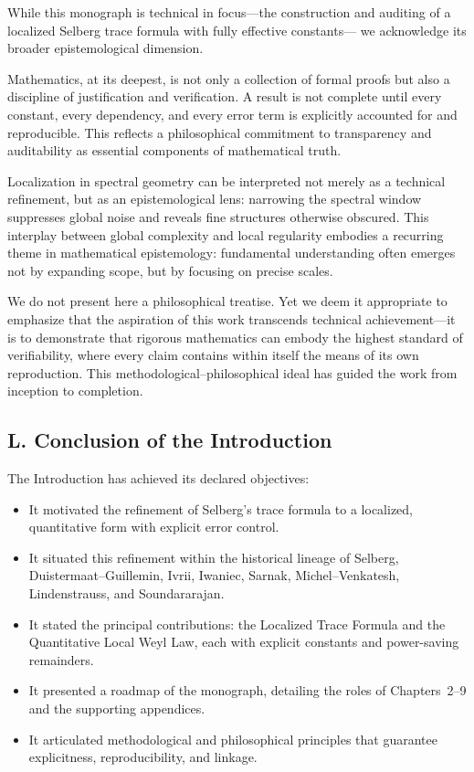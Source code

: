 While this monograph is technical in focus—the construction and auditing
of a localized Selberg trace formula with fully effective constants—
we acknowledge its broader epistemological dimension.

Mathematics, at its deepest, is not only a collection of formal proofs
but also a discipline of justification and verification.
A result is not complete until every constant, every dependency,
and every error term is explicitly accounted for and reproducible.
This reflects a philosophical commitment to transparency and auditability
as essential components of mathematical truth.

Localization in spectral geometry can be interpreted not merely as a technical refinement,
but as an epistemological lens: narrowing the spectral window suppresses global noise
and reveals fine structures otherwise obscured.
This interplay between global complexity and local regularity
embodies a recurring theme in mathematical epistemology:
fundamental understanding often emerges not by expanding scope,
but by focusing on precise scales.

We do not present here a philosophical treatise.
Yet we deem it appropriate to emphasize that the aspiration of this work
transcends technical achievement—it is to demonstrate
that rigorous mathematics can embody the highest standard of verifiability,
where every claim contains within itself the means of its own reproduction.
This methodological–philosophical ideal has guided the work from inception to completion.

\subsection*{L. Conclusion of the Introduction}

The Introduction has achieved its declared objectives:

\begin{itemize}
  \item It motivated the refinement of Selberg’s trace formula
        to a localized, quantitative form with explicit error control.
  \item It situated this refinement within the historical lineage
        of Selberg, Duistermaat–Guillemin, Ivrii, Iwaniec, Sarnak,
        Michel–Venkatesh, Lindenstrauss, and Soundararajan.
  \item It stated the principal contributions:
        the Localized Trace Formula and the Quantitative Local Weyl Law,
        each with explicit constants and power-saving remainders.
  \item It presented a roadmap of the monograph,
        detailing the roles of Chapters~2–9 and the supporting appendices.
  \item It articulated methodological and philosophical principles
        that guarantee explicitness, reproducibility, and linkage.
\end{itemize}

